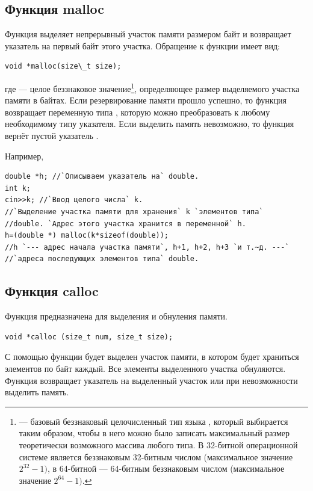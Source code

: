 \subsection[Функция malloc]{Функция malloc}
Функция  выделяет непрерывный участок памяти размером
 байт и возвращает указатель на первый байт этого участка. Обращение к функции имеет вид:

\begin{lstlisting}
void *malloc(size\_t size);
\end{lstlisting}

где  --- целое беззнаковое значение\footnote{ --- базовый беззнаковый целочисленный тип языка
, который выбирается таким образом, чтобы в него можно было записать максимальный размер теоретически возможного
массива любого типа. В 32-битной операционной системе  является беззнаковым 32-битным числом (максимальное
значение  $2^{32}-1)$, в 64-битной --- 64-битным беззнаковым числом (максимальное значение  $2^{64}-1)$.}, определяющее
размер выделяемого участка памяти в байтах. Если резервирование памяти прошло успешно, то функция возвращает переменную
типа , которую можно преобразовать к любому необходимому типу указателя. Если выделить память
невозможно, то функция вернёт пустой указатель .

Например,
\begin{lstlisting}
double *h; //`Описываем указатель на` double.
int k;
cin>>k; //`Ввод целого числа` k.
//`Выделение участка памяти для хранения` k `элементов типа`
//double. `Адрес этого участка хранится в переменной` h.
h=(double *) malloc(k*sizeof(double));
//h `--- адрес начала участка памяти`, h+1, h+2, h+3 `и т.~д. ---`
//`адреса последующих элементов типа` double.
\end{lstlisting}

\subsection[Функция calloc]{Функция calloc}
Функция  предназначена для выделения и обнуления памяти. 
\begin{lstlisting}
void *calloc (size_t num, size_t size);
\end{lstlisting}

С помощью функции будет выделен участок памяти, в котором будет храниться  элементов по
 байт каждый. Все элементы выделенного участка обнуляются. Функция возвращает указатель
на выделенный участок или  при невозможности выделить память.

